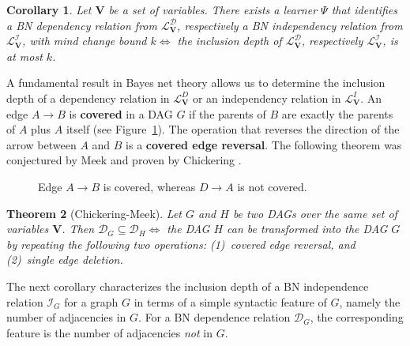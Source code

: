 \documentclass{elsarticle}%
\newtheorem{theorem}{Theorem}
\newtheorem{corollary}[theorem]{Corollary}
\DeclareMathOperator{\ID}{ID}
\renewcommand{\L}{\mathcal{L}}
\newcommand{\G}{G}
\newcommand{\VV}{\mathbf{V}}
\newcommand{\D}{\mathcal{D}}
\newcommand{\I}{\mathcal{I}}
\newcommand{\lvd}{\mathcal{L}^{D}_{\VV}}
\newcommand{\lvi}{\mathcal{L}^{I}_{\VV}}
\begin{document}
\begin{corollary}
Let $\mathbf{V}$ be a set of variables. 
There exists a learner $\Psi$ that identifies a BN dependency relation from $\L_{\mathbf{V}}^{\D}$, respectively a BN independency relation from $\L_{\mathbf{V}}^{\I}$, with mind change bound $k
\iff$ the inclusion depth of $\L_{\mathbf{V}}^{\D}$, respectively $\L_{\mathbf{V}}^{\I}$, is at most $k$.
\end{corollary}
A fundamental result in Bayes net theory allows
us to determine the inclusion depth of a dependency relation in $\lvd$ or an independency relation in $\lvi$.
An edge $A\rightarrow B$ is \textbf{covered} in a DAG $G$ if the parents of $B$
are exactly the parents of $A$ plus $A$ itself (see Figure~\ref{fig:covered_arc}). The operation that reverses the
direction of the arrow between $A$ and $B$ is a \textbf{covered edge reversal}.
The following theorem was conjectured by Meek
\cite{meek97:_graph_modeln}
and proven by Chickering \cite[Thm.4]{chickering03:_optim}.

\begin{figure}[h]
\centering
{} \caption{Edge
$A\rightarrow B$ is covered, whereas $D\rightarrow A$ is not covered.}%
\label{fig:covered_arc}%
\end{figure}


\begin{theorem}  
  [Chickering-Meek]\label{lm:meek-conjecture}
  \label{thm:meek}
  Let $G$
and $H$ be two DAGs over the same set of variables $\mathbf{V}$. Then
$\D_{G}\subseteq\D_{H}\iff$ the DAG $H$ can be transformed
into the DAG $G$ by repeating the following two operations: (1)~covered edge
reversal, and (2)~single edge deletion.
\end{theorem}
%
The next corollary characterizes the
inclusion depth of a BN independence relation $\I_G$ for a graph $G$
in terms of a simple syntactic feature of $G$, namely the number of adjacencies in $\G$. For a BN dependence relation $\D_G$, the corresponding feature is the number of adjacencies {\em not} in $\G$.
\end{document}
